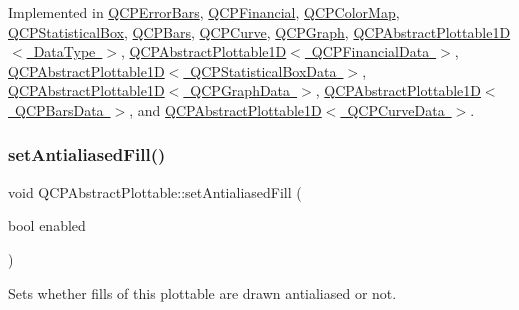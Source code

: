 Implemented in \mbox{\hyperlink{class_q_c_p_error_bars_ac1b6675ef43e32547a3cbcf7b7ac46ed}{Q\+C\+P\+Error\+Bars}}, \mbox{\hyperlink{class_q_c_p_financial_aac8e91622ac58330fa9ce81cc8fd40ee}{Q\+C\+P\+Financial}}, \mbox{\hyperlink{class_q_c_p_color_map_afb4b843596addf58096082827a9e3450}{Q\+C\+P\+Color\+Map}}, \mbox{\hyperlink{class_q_c_p_statistical_box_a1607fa92f829c631107c20ccb2d70a6d}{Q\+C\+P\+Statistical\+Box}}, \mbox{\hyperlink{class_q_c_p_bars_a121f899c27af3186fe93dcd0eb98f49b}{Q\+C\+P\+Bars}}, \mbox{\hyperlink{class_q_c_p_curve_a0ed9b7e6b4bc72010d6fcd974af46a8b}{Q\+C\+P\+Curve}}, \mbox{\hyperlink{class_q_c_p_graph_a6d669d04462d272c6aa0e5f85846d673}{Q\+C\+P\+Graph}}, \mbox{\hyperlink{class_q_c_p_abstract_plottable1_d_a4611b43bcb6441b2154eb4f4e0a33db2}{Q\+C\+P\+Abstract\+Plottable1\+D$<$ Data\+Type $>$}}, \mbox{\hyperlink{class_q_c_p_abstract_plottable1_d_a4611b43bcb6441b2154eb4f4e0a33db2}{Q\+C\+P\+Abstract\+Plottable1\+D$<$ Q\+C\+P\+Financial\+Data $>$}}, \mbox{\hyperlink{class_q_c_p_abstract_plottable1_d_a4611b43bcb6441b2154eb4f4e0a33db2}{Q\+C\+P\+Abstract\+Plottable1\+D$<$ Q\+C\+P\+Statistical\+Box\+Data $>$}}, \mbox{\hyperlink{class_q_c_p_abstract_plottable1_d_a4611b43bcb6441b2154eb4f4e0a33db2}{Q\+C\+P\+Abstract\+Plottable1\+D$<$ Q\+C\+P\+Graph\+Data $>$}}, \mbox{\hyperlink{class_q_c_p_abstract_plottable1_d_a4611b43bcb6441b2154eb4f4e0a33db2}{Q\+C\+P\+Abstract\+Plottable1\+D$<$ Q\+C\+P\+Bars\+Data $>$}}, and \mbox{\hyperlink{class_q_c_p_abstract_plottable1_d_a4611b43bcb6441b2154eb4f4e0a33db2}{Q\+C\+P\+Abstract\+Plottable1\+D$<$ Q\+C\+P\+Curve\+Data $>$}}.

\mbox{\label{class_q_c_p_abstract_plottable_a089d6b5577120239b55c39ed27c39536}} 
\subsubsection{\texorpdfstring{setAntialiasedFill()}{setAntialiasedFill()}}
{\footnotesize\ttfamily void Q\+C\+P\+Abstract\+Plottable\+::set\+Antialiased\+Fill (\begin{DoxyParamCaption}\item[{bool}]{enabled }\end{DoxyParamCaption})}

Sets whether fills of this plottable are drawn antialiased or not.

